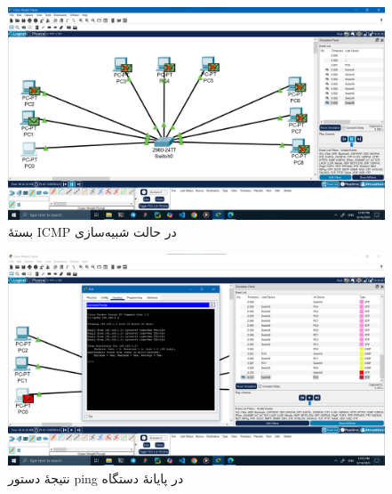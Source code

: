 \documentclass[12pt]{article}
\begin{document}
	\begin{figure}[H]
		\centering
		\includegraphics[width=\textwidth]{resources/5.png}
		\caption{بستهٔ \textenglish{ICMP} در حالت شبیه‌سازی}
		\label{img:5}
	\end{figure}
	\begin{figure}[H]
		\centering
		\includegraphics[width=\textwidth]{resources/6.png}
		\caption{نتیجهٔ دستور \textenglish{ping} در پایانهٔ دستگاه}
		\label{img:6}
	\end{figure}
	
	\newpage
\end{document}
